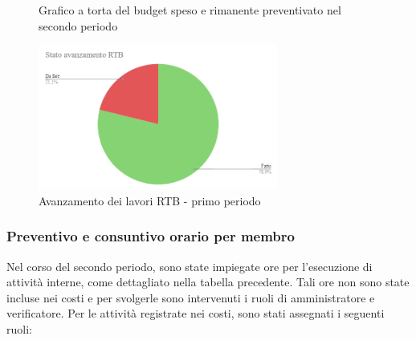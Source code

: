 \begin{figure}[ht]
    \centering
    \begin{minipage}[b]{0.45\textwidth}
        \centering
        \caption{Grafico a torta del budget speso e rimanente preventivato nel secondo periodo}
        \label{fig:GraficoTorta2}
    \end{minipage}
    
    \vspace{1cm}

    \begin{minipage}[b]{0.70\textwidth}
        \centering
        \includegraphics[width=0.7\textwidth]{../Images/avanzamento2Periodo.png}
        \caption{Avanzamento dei lavori RTB - primo periodo}
        \label{fig:AvRtb1}
    \end{minipage}
\end{figure}

\subsubsection*{Preventivo e consuntivo orario per membro}
Nel corso del secondo periodo, sono state impiegate ore per l'esecuzione di attività interne, come dettagliato nella tabella precedente. Tali ore non sono state incluse nei costi e per svolgerle sono intervenuti i ruoli di amministratore e verificatore.
Per le attività registrate nei costi, sono stati assegnati i seguenti ruoli:

